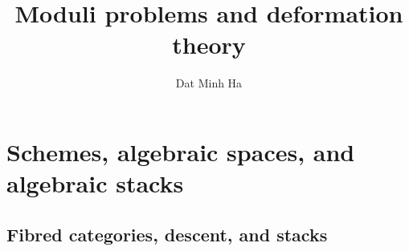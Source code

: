 

\setcounter{section}{-1}





	\title{Moduli problems and deformation theory}
	
	\author{Dat Minh Ha}
	\maketitle
	
	\begin{abstract}
	    
	\end{abstract}
	
	{
      \hypersetup{} 
      \dominitoc
      \tableofcontents %
    }
    
    \chapter{Schemes, algebraic spaces, and algebraic stacks}
        \begin{abstract}
            
        \end{abstract}
        
        \minitoc
    
        
        
        
        
        
        
        \begin{appendices}
            \chapter{Fibred categories, descent, and stacks}
                \begin{abstract}
            
                \end{abstract}
                
                \minitoc
                
                
                
                
        \end{appendices}
        
